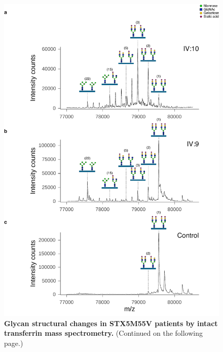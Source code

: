 \begin{figure}
    \includegraphics[keepaspectratio=true,width=\textwidth,height=\textheight]{chapters/chapter6/chapter6_SupplementaryFigure2.pdf}
    \caption{\textbf{Glycan structural changes in STX5M55V patients by intact transferrin mass spectrometry.} (Continued on the following page.)}
    \label{fig:ch6supfig2}
\end{figure}
\begin{figure}[t]
\end{figure}

\clearpage


